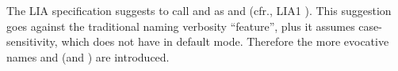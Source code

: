 \documentclass[../Comparisons-Predicates.tex]{subfiles}
\begin{document}

\DNotes{}

The LIA specification suggests to call  and 
as  and  (cfr., LIA1
\cite{2012:LIA1}). This suggestion goes against the traditional \CL{}
naming verbosity ``feature'', plus it assumes case-sensitivity, which
\CL{} does not have in default mode. Therefore the more evocative
names  and  (and ) are
introduced.
\end{document}
